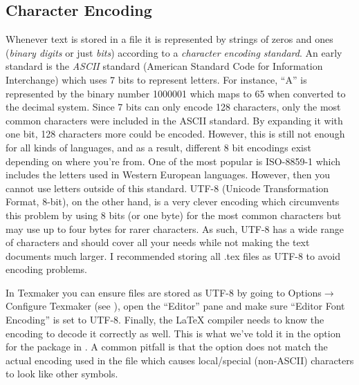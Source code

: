 \subsection{Character Encoding}
Whenever text is stored in a file it is represented by strings of zeros and ones (\emph{binary digits} or just \emph{bits}) according to a \emph{character encoding standard}. An early standard is the \emph{ASCII} standard (American Standard Code for Information Interchange) which uses 7 bits to represent letters. For instance, ``A'' is represented by the binary number 1000001 which maps to 65 when converted to the decimal system. Since 7 bits can only encode 128 characters, only the most common characters were included in the ASCII standard. By expanding it with one bit, 128 characters more could be encoded. However, this is still not enough for all kinds of languages, and as a result, different 8 bit encodings exist depending on where you're from. One of the most popular is ISO-8859-1 which includes the letters used in Western European languages. However, then you cannot use letters outside of this standard. UTF-8 (Unicode Transformation Format, 8-bit), on the other hand, is a very clever encoding which circumvents this problem by using 8 bits (or one byte) for the most common characters but may use up to four bytes for rarer characters. As such, UTF-8 has a wide range of characters and should cover all your needs while not making the text documents much larger. I recommended storing all .tex files as UTF-8 to avoid encoding problems.

In Texmaker you can ensure files are stored as UTF-8 by going to Options$\rightarrow$ Configure Texmaker (see ), open the ``Editor'' pane and make sure ``Editor Font Encoding'' is set to UTF-8. Finally, the \LaTeX{} compiler needs to know the encoding to decode it correctly as well. This is what we've told it in the option for the  package in . A common pitfall is that the  option does not match the actual encoding used in the file which causes local/special (non-ASCII) characters to look like other symbols.

